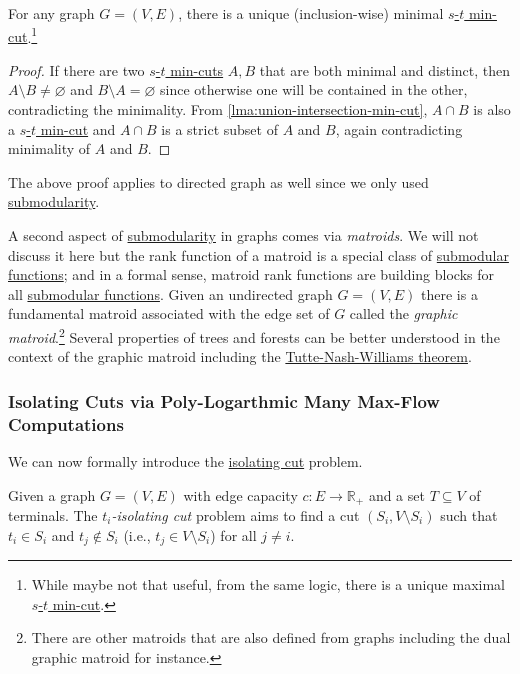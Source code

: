 \begin{corollary}\label{col:union-intersection-min-cut}
	For any graph \(G = (V, E)\), there is a unique (inclusion-wise) minimal \hyperref[prb:s-t-min-cut]{\(s\)-\(t\) min-cut}.\footnote{While maybe not that useful, from the same logic, there is a unique maximal \hyperref[prb:s-t-min-cut]{\(s\)-\(t\) min-cut}.}
\end{corollary}
\begin{proof}
	If there are two \hyperref[prb:s-t-min-cut]{\(s\)-\(t\) min-cuts} \(A, B\) that are both minimal and distinct, then \(A\setminus B \neq \varnothing \) and \(B \setminus A = \varnothing \) since otherwise one will be contained in the other, contradicting the minimality. From \autoref{lma:union-intersection-min-cut}, \(A \cap B\) is also a \hyperref[prb:s-t-min-cut]{\(s\)-\(t\) min-cut} and \(A \cap B\) is a strict subset of \(A\) and \(B\), again contradicting minimality of \(A\) and \(B\).
\end{proof}

The above proof applies to directed graph as well since we only used \hyperref[def:submodular]{submodularity}.

\begin{remark}
	A second aspect of \hyperref[def:submodular]{submodularity} in graphs comes via \emph{matroids}. We will not discuss it here but the rank function of a matroid is a special class of \hyperref[def:submodular]{submodular functions}; and in a formal sense, matroid rank functions are building blocks for all \hyperref[def:submodular]{submodular functions}. Given an undirected graph \(G = (V, E)\) there is a fundamental matroid associated with the edge set of \(G\) called the \emph{graphic matroid}.\footnote{There are other matroids that are also defined from graphs including the dual graphic matroid for instance.} Several properties of trees and forests can be better understood in the context of the graphic matroid including the \hyperref[thm:Tutte-Nash-Williams]{Tutte-Nash-Williams theorem}.
\end{remark}

\subsubsection{Isolating Cuts via Poly-Logarthmic Many Max-Flow Computations}
We can now formally introduce the \hyperref[prb:isolating-cut]{isolating cut} problem.

\begin{problem}\label{prb:isolating-cut}
Given a graph \(G = (V, E)\) with edge capacity \(c \colon E \to \mathbb{R} _+ \) and a set \(T \subseteq V\) of terminals. The \emph{\(t_i\)-isolating cut} problem aims to find a cut \((S_i, V\setminus S_i)\) such that \(t_i \in S_i\) and \(t_j \notin S_i\) (i.e., \(t_j \in V \setminus S_i\)) for all \(j \neq i\).
\end{problem}

